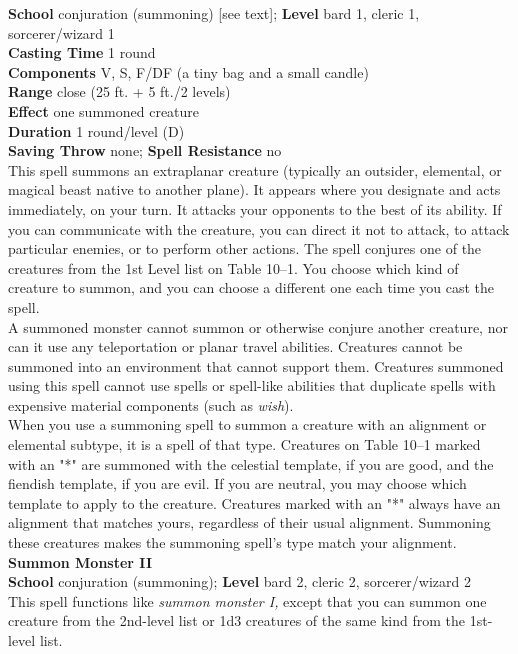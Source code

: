 \textbf{School} conjuration (summoning) [see text]; \textbf{Level} bard 1, cleric 1, sorcerer/wizard 1\\
\textbf{Casting Time} 1 round\\
\textbf{Components} V, S, F/DF (a tiny bag and a small candle)\\
\textbf{Range} close (25 ft. + 5 ft./2 levels)\\
\textbf{Effect} one summoned creature\\
\textbf{Duration} 1 round/level (D)\\
\textbf{Saving Throw} none; \textbf{Spell Resistance} no\\
This spell summons an extraplanar creature (typically an outsider, elemental, or magical beast native to another plane). It appears where you designate and acts immediately, on your turn. It attacks your opponents to the best of its ability. If you can communicate with the creature, you can direct it not to attack, to attack particular enemies, or to perform other actions. The spell conjures one of the creatures from the 1st Level list on Table 10--1. You choose which kind of creature to summon, and you can choose a different one each time you cast the spell.\\
A summoned monster cannot summon or otherwise conjure another creature, nor can it use any teleportation or planar travel abilities. Creatures cannot be summoned into an environment that cannot support them. Creatures summoned using this spell cannot use spells or spell-like abilities that duplicate spells with expensive material components (such as \textit{wish}).\\
When you use a summoning spell to summon a creature with an alignment or elemental subtype, it is a spell of that type. Creatures on Table 10--1 marked with an "*" are summoned with the celestial template, if you are good, and the fiendish template, if you are evil. If you are neutral, you may choose which template to apply to the creature. Creatures marked with an "*" always have an alignment that matches yours, regardless of their usual alignment. Summoning these creatures makes the summoning spell's type match your alignment.\\
\textbf{Summon Monster II}\\
\textbf{School} conjuration (summoning); \textbf{Level} bard 2, cleric 2, sorcerer/wizard 2\\
This spell functions like \textit{summon monster I, }except that you can summon one creature from the 2nd-level list or 1d3 creatures of the same kind from the 1st-level list.\\
